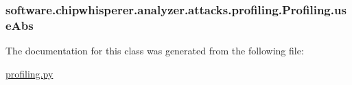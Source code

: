 \hypertarget{classsoftware_1_1chipwhisperer_1_1analyzer_1_1attacks_1_1profiling_1_1Profiling_a349d6c4d9e8d3044028da974bb747faf}{}
\subsubsection[{use\+Abs}]{\setlength{\rightskip}{0pt plus 5cm}software.\+chipwhisperer.\+analyzer.\+attacks.\+profiling.\+Profiling.\+use\+Abs}\label{classsoftware_1_1chipwhisperer_1_1analyzer_1_1attacks_1_1profiling_1_1Profiling_a349d6c4d9e8d3044028da974bb747faf}


The documentation for this class was generated from the following file\+:\begin{DoxyCompactItemize}
\item 
\hyperlink{profiling_8py}{profiling.\+py}\end{DoxyCompactItemize}
